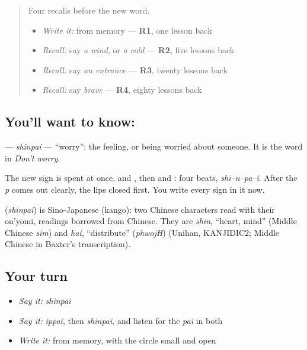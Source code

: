 \label{lesson:JA-C137-shinpai}



\begin{quote}
Four recalls before the new word.

\begin{itemize}
\raggedright
  \item \emph{Write it:} \textbf{} from memory — \textbf{R1}, one lesson back
  \item \emph{Recall:} say \emph{a wind}, or \emph{a cold} — \textbf{R2}, five lessons back
  \item \emph{Recall:} say \emph{an entrance} — \textbf{R3}, twenty lessons back
  \item \emph{Recall:} say \emph{brave} — \textbf{R4}, eighty lessons back
\end{itemize}
\end{quote}

\subsection*{You'll want to know: }
\textbf{} — \emph{shinpai} — \textquotedblleft{}worry\textquotedblright{}: the feeling, or being worried about someone. It is the word in \emph{Don't worry}.

The new sign is spent at once. \textbf{} and \textbf{}, then \textbf{} and \textbf{}: four beats, \emph{shi–n–pa–i}. After \textbf{} the \emph{p} comes out clearly, the lips closed first. You write every sign in it now.

\begin{cousinweb}
\textbf{} (\emph{shinpai}) is Sino-Japanese (kango): two Chinese characters read with their on'yomi, readings borrowed from Chinese. They are \emph{shin}, \textquotedblleft{}heart, mind\textquotedblright{} (Middle Chinese \emph{sim}) and \emph{hai}, \textquotedblleft{}distribute\textquotedblright{} (\emph{phwojH}) (Unihan, KANJIDIC2; Middle Chinese in Baxter's transcription).
\end{cousinweb}

\subsection*{Your turn}
\begin{itemize}
\raggedright
  \item \emph{Say it:} \emph{shinpai}
  \item \emph{Say it:} \emph{ippai}, then \emph{shinpai}, and listen for the \emph{pai} in both
  \item \emph{Write it:} \textbf{} from memory, with the circle small and open
\end{itemize}

